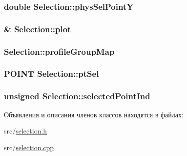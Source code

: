 \hypertarget{class_selection_ae34c8ddfe73abfaaeec3b99bb649f802}{
\subsubsection[{phys\-Sel\-Point\-Y}]{\setlength{\rightskip}{0pt plus 5cm}double Selection\-::phys\-Sel\-Point\-Y\hspace{0.3cm}{\ttfamily [protected]}}}\label{class_selection_ae34c8ddfe73abfaaeec3b99bb649f802}
\hypertarget{class_selection_a5446aca339af493b9853e1d8791747ee}{
\subsubsection[{plot}]{\& Selection\-::plot\hspace{0.3cm}{\ttfamily [protected]}}}\label{class_selection_a5446aca339af493b9853e1d8791747ee}
\hypertarget{class_selection_a9969ae2dd3dfc1de2ff22851f23ca701}{
\subsubsection[{profile\-Group\-Map}]{ Selection\-::profile\-Group\-Map\hspace{0.3cm}{\ttfamily [protected]}}}\label{class_selection_a9969ae2dd3dfc1de2ff22851f23ca701}
\hypertarget{class_selection_a2ba4d3b1be1be25852a81ae8d8b85464}{
\subsubsection[{pt\-Sel}]{\setlength{\rightskip}{0pt plus 5cm}P\-O\-I\-N\-T Selection\-::pt\-Sel\hspace{0.3cm}{\ttfamily [protected]}}}\label{class_selection_a2ba4d3b1be1be25852a81ae8d8b85464}
\hypertarget{class_selection_aae0adc2fbecf906fe191f37db02865d9}{
\subsubsection[{selected\-Point\-Ind}]{\setlength{\rightskip}{0pt plus 5cm}unsigned Selection\-::selected\-Point\-Ind\hspace{0.3cm}{\ttfamily [protected]}}}\label{class_selection_aae0adc2fbecf906fe191f37db02865d9}


Объявления и описания членов классов находятся в файлах\-:\begin{DoxyCompactItemize}
\item 
src/\hyperlink{selection_8h}{selection.\-h}\item 
src/\hyperlink{selection_8cpp}{selection.\-cpp}\end{DoxyCompactItemize}
